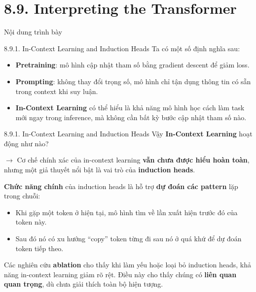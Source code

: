 \section{8.9. Interpreting the Transformer}

\begin{frame}{Nội dung trình bày}
	\tableofcontents[currentsection]
\end{frame}

\begin{frame}{8.9.1. In-Context Learning and Induction Heads}
Ta có một số định nghĩa sau:
		\begin{itemize}
			\item \textbf{Pretraining}: mô hình cập nhật tham số bằng gradient descent để giảm loss.
			\item \textbf{Prompting}: không thay đổi trọng số, mô hình chỉ tận dụng thông tin có sẵn trong context khi suy luận.
			\item \textbf{In-Context Learning} có thể hiểu là khả năng mô hình học cách làm task mới ngay trong inference, mà không cần bất kỳ bước cập nhật tham số nào.
		\end{itemize}
\end{frame}

\begin{frame}{8.9.1. In-Context Learning and Induction Heads}
	Vậy \textbf{In-Context Learning} hoạt động như nào?
	
	$\rightarrow$ Cơ chế chính xác của in-context learning \textbf{vẫn chưa được hiểu hoàn toàn}, nhưng một giả thuyết nổi bật là vai trò của \textbf{induction heads}.
	
	\vspace{0.5cm}
	
	\pause
	\textbf{Chức năng chính} của induction heads là hỗ trợ \textbf{dự đoán các pattern} lặp trong chuỗi:
	\begin{itemize}
		\item Khi gặp một token ở hiện tại, mô hình tìm về lần xuất hiện trước đó của token này.
		\item Sau đó nó có xu hướng “copy” token từng đi sau nó ở quá khứ để dự đoán token tiếp theo.
	\end{itemize}
	
	\vspace{0.5cm}
	\pause
	Các nghiên cứu \textbf{ablation} cho thấy khi làm yếu hoặc loại bỏ induction heads, khả năng in-context learning giảm rõ rệt. Điều này cho thấy chúng có \textbf{liên quan quan trọng}, dù chưa giải thích toàn bộ hiện tượng.
\end{frame}

